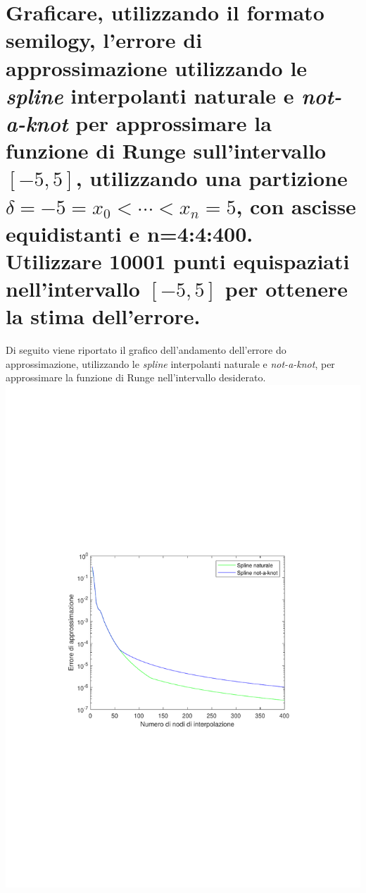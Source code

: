 \documentclass[10pt,a4paper]{article}
\begin{document}
\section{
Graficare, utilizzando il formato semilogy, l'errore di approssimazione utilizzando le
\textit{spline} interpolanti naturale e \textit{not-a-knot} per approssimare la funzione di Runge sull'intervallo $ [-5,5] $,
utilizzando una partizione $ \delta = {-5 = x_0 < \cdots < x_n = 5} $, con ascisse equidistanti e \textbf{n=4:4:400}.
\\
Utilizzare 10001 punti equispaziati nell'intervallo $ [-5,5] $ per ottenere la stima dell'errore.
}
Di seguito viene riportato il grafico dell'andamento dell'errore do approssimazione, utilizzando
le \textit{spline} interpolanti naturale e \textit{not-a-knot}, per approssimare la funzione di 
Runge nell'intervallo desiderato.
\\
\includegraphics*[scale=0.80]{./esercizi/imgs/grafico_23.pdf}
\end{document}
